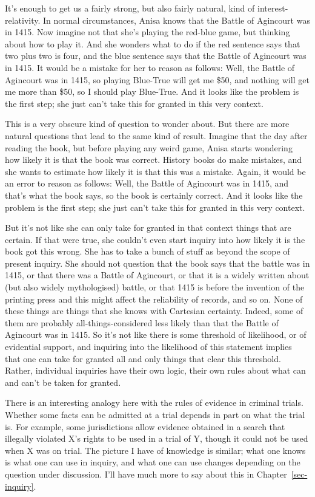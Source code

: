 \documentclass[
  12pt,
  letterpaper,
]{scrbook}
\begin{document}
It's enough to get us a fairly strong, but also fairly natural, kind of
interest-relativity. In normal circumstances, Anisa knows that the
Battle of Agincourt was in 1415. Now imagine not that she's playing the
red-blue game, but thinking about how to play it. And she wonders what
to do if the red sentence says that two plus two is four, and the blue
sentence says that the Battle of Agincourt was in 1415. It would be a
mistake for her to reason as follows: Well, the Battle of Agincourt was
in 1415, so playing Blue-True will get me \$50, and nothing will get me
more than \$50, so I should play Blue-True. And it looks like the
problem is the first step; she just can't take this for granted in this
very context.

This is a very obscure kind of question to wonder about. But there are
more natural questions that lead to the same kind of result. Imagine
that the day after reading the book, but before playing any weird game,
Anisa starts wondering how likely it is that the book was correct.
History books do make mistakes, and she wants to estimate how likely it
is that this was a mistake. Again, it would be an error to reason as
follows: Well, the Battle of Agincourt was in 1415, and that's what the
book says, so the book is certainly correct. And it looks like the
problem is the first step; she just can't take this for granted in this
very context.

But it's not like she can only take for granted in that context things
that are certain. If that were true, she couldn't even start inquiry
into how likely it is the book got this wrong. She has to take a bunch
of stuff as beyond the scope of present inquiry. She should not question
that the book says that the battle was in 1415, or that there was a
Battle of Agincourt, or that it is a widely written about (but also
widely mythologised) battle, or that 1415 is before the invention of the
printing press and this might affect the reliability of records, and so
on. None of these things are things that she knows with Cartesian
certainty. Indeed, some of them are probably all-things-considered less
likely than that the Battle of Agincourt was in 1415. So it's not like
there is some threshold of likelihood, or of evidential support, and
inquiring into the likelihood of this statement implies that one can
take for granted all and only things that clear this threshold. Rather,
individual inquiries have their own logic, their own rules about what
can and can't be taken for granted.

There is an interesting analogy here with the rules of evidence in
criminal trials. Whether some facts can be admitted at a trial depends
in part on what the trial is. For example, some jurisdictions allow
evidence obtained in a search that illegally violated X's rights to be
used in a trial of Y, though it could not be used when X was on trial.
The picture I have of knowledge is similar; what one knows is what one
can use in inquiry, and what one can use changes depending on the
question under discussion. I'll have much more to say about this in
Chapter~\ref{sec-inquiry}.
\end{document}
